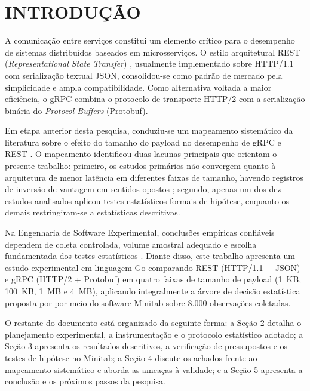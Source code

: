 \documentclass[a4paper, 12pt]{article}
\begin{document}
\section{INTRODUÇÃO}

A comunicação entre serviços constitui um elemento crítico para o desempenho de sistemas distribuídos baseados em microsserviços. O estilo arquitetural REST (\textit{Representational State Transfer}) \cite{fielding2000}, usualmente implementado sobre HTTP/1.1 com serialização textual JSON, consolidou-se como padrão de mercado pela simplicidade e ampla compatibilidade. Como alternativa voltada a maior eficiência, o gRPC \cite{talwar2016} combina o protocolo de transporte HTTP/2 com a serialização binária do \textit{Protocol Buffers} (Protobuf).

Em etapa anterior desta pesquisa, conduziu-se um mapeamento sistemático da literatura sobre o efeito do tamanho do payload no desempenho de gRPC e REST \cite{coimbra2026}. O mapeamento identificou duas lacunas principais que orientam o presente trabalho: primeiro, os estudos primários não convergem quanto à arquitetura de menor latência em diferentes faixas de tamanho, havendo registros de inversão de vantagem em sentidos opostos \cite{soares2024,kazanavicius2023,bolanowski2022}; segundo, apenas um dos dez estudos analisados aplicou testes estatísticos formais de hipótese, enquanto os demais restringiram-se a estatísticas descritivas.

Na Engenharia de Software Experimental, conclusões empíricas confiáveis dependem de coleta controlada, volume amostral adequado e escolha fundamentada dos testes estatísticos \cite{wohlin2012,sirqueira2015}. Diante disso, este trabalho apresenta um estudo experimental em linguagem Go comparando REST (HTTP/1.1 + JSON) e gRPC (HTTP/2 + Protobuf) em quatro faixas de tamanho de payload (1~KB, 100~KB, 1~MB e 4~MB), aplicando integralmente a árvore de decisão estatística proposta por  por meio do software Minitab sobre 8.000 observações coletadas.

O restante do documento está organizado da seguinte forma: a Seção 2 detalha o planejamento experimental, a instrumentação e o protocolo estatístico adotado; a Seção 3 apresenta os resultados descritivos, a verificação de pressupostos e os testes de hipótese no Minitab; a Seção 4 discute os achados frente ao mapeamento sistemático e aborda as ameaças à validade; e a Seção 5 apresenta a conclusão e os próximos passos da pesquisa.
\end{document}
